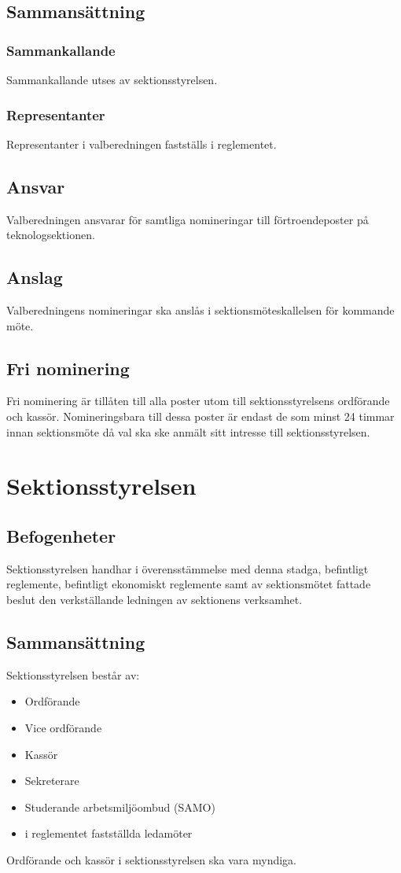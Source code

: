 \documentclass[a4paper]{dtek}
\begin{document}
\subsection{Sammansättning}
\subsubsection{Sammankallande}
Sammankallande utses av sektionsstyrelsen.
\subsubsection{Representanter}
Representanter i valberedningen fastställs i reglementet.
\subsection{Ansvar}
Valberedningen ansvarar för samtliga nomineringar till förtroendeposter på teknologsektionen.
\subsection{Anslag}
Valberedningens nomineringar ska anslås i sektionsmöteskallelsen för kommande möte.
\subsection{Fri nominering}
Fri nominering är tillåten till alla poster utom till sektionsstyrelsens ordförande och kassör. Nomineringsbara till dessa poster är endast de som minst 24 timmar innan sektionsmöte då val ska ske anmält sitt intresse till sektionsstyrelsen.
\newpage

\section{Sektionsstyrelsen}
\subsection{Befogenheter}
Sektionsstyrelsen handhar i överensstämmelse med denna stadga, befintligt reglemente, befintligt ekonomiskt reglemente samt av sektionsmötet fattade beslut den verkställande ledningen av sektionens verksamhet.
\subsection{Sammansättning}
Sektionsstyrelsen består av:
\begin{itemize}
\item Ordförande
\item Vice ordförande
\item Kassör
\item Sekreterare
\item Studerande arbetsmiljöombud (SAMO)
\item i reglementet fastställda ledamöter
\end{itemize}
Ordförande och kassör i sektionsstyrelsen ska vara myndiga.
\end{document}
